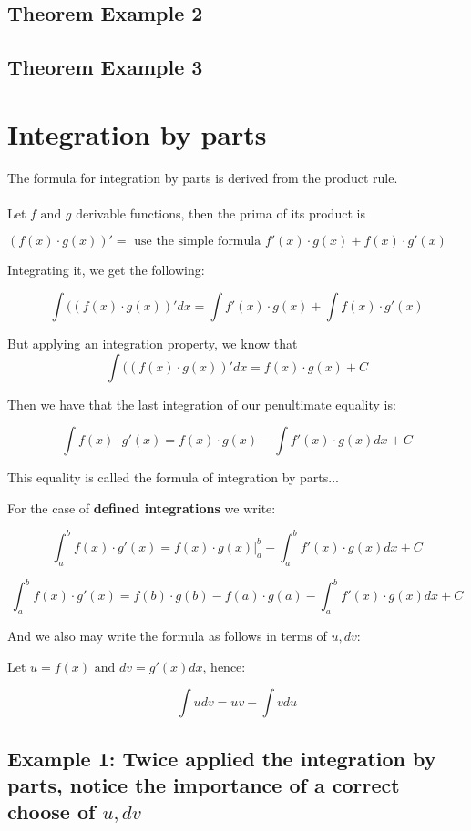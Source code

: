 \documentclass{article}
\begin{document}
\subsection*{Theorem Example 2}

\subsection*{Theorem Example 3}

\section*{Integration by parts}
The formula for integration by parts is derived from the product rule.
\\
\\
Let \(f \text{ and } g\) derivable functions, then the prima of its product is 

\((f(x) \cdot g(x))' = \text{ use the simple formula } f'(x) \cdot g(x) + f(x) \cdot g'(x)\)

Integrating it, we get the following:

\[\int ((f(x) \cdot g(x))' dx = \int f'(x) \cdot g(x) + \int f(x) \cdot g'(x)\] 

But applying an integration property, we know that 
\[\int ((f(x) \cdot g(x))' dx = f(x) \cdot g(x) + C\]

Then we have that the last integration of our penultimate equality is:

\[\int f(x) \cdot g'(x) = f(x) \cdot g(x) - \int f'(x) \cdot g(x) dx +C \]

This equality is called the formula of integration by parts...

For the case of \textbf{defined integrations} we write:

\[\int_{a}^{b} f(x) \cdot g'(x) = f(x) \cdot g(x) \bigg|_{a}^{b}- \int_{a}^{b} f'(x) \cdot g(x) dx +C \]

\[\int_{a}^{b} f(x) \cdot g'(x) = f(b) \cdot g(b) - f(a) \cdot g(a) - \int_{a}^{b} f'(x) \cdot g(x) dx +C \]

And we also may write the formula as follows in terms of \(u, dv:\)

Let \(u=f(x) \text{ and } dv = g'(x) dx \), hence:

\[ \int udv = uv - \int vdu\]

\subsection*{Example 1: Twice applied the integration by parts, notice the importance of a correct choose of \(u, dv\)}
\end{document}
